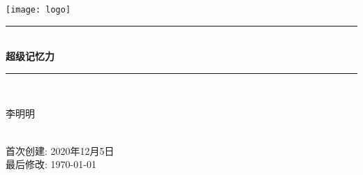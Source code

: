 
\begin{titlepage}

\newcommand{\HRule}{\rule{\linewidth}{0.5mm}} %

\center                         %
 

\texttt{[image: logo]}\\[1cm] %


\HRule\\[0.4cm]
{ \huge \bfseries 超级记忆力}\\[0.4cm] %
\HRule\\[1.5cm]
 

\begin{minipage}{0.4\textwidth}
\begin{center} \large
李明明\\ %
\end{center}

\end{minipage}\\[2cm]


\vfill
{\large 首次创建: 2020年12月5日}\\
{\large 最后修改: \today}\\[2cm] %



\end{titlepage}

